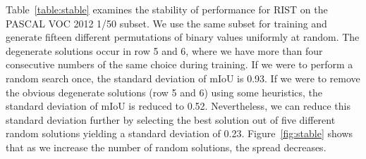 \documentclass[10pt, conference, compsocconf]{IEEEtran}
\begin{document}
\begin{table}[!htb]
\centering
{}
\bigskip
\caption{RIST semantic segmentation results on the PASCAL VOC 2012 validation set. Group experiment results are selected based on the best development mIoU. Random selection choices are P (pseudo-label only) or L (human-label only). There are a total of nine refinement stages ordered sequentially from left to right. }
\label{table:stable}
\end{table}


Table~\ref{table:stable} examines the stability of performance for RIST on the PASCAL VOC 2012 1/50 subset. We use the same subset for training and generate fifteen different permutations of binary  values uniformly at random.
The degenerate solutions occur in row 5 and 6, where we have more than four consecutive numbers of the same  choice during training. If we were to perform a random search once, the standard deviation of mIoU is 0.93. If we were to remove the obvious degenerate solutions (row 5 and 6) using some heuristics, the standard deviation of mIoU is reduced to 0.52. Nevertheless, we can reduce this standard deviation further by selecting the best solution out of five different random solutions yielding a standard deviation of 0.23. Figure~\ref{fig:stable} shows that as we increase the number of random solutions, the spread decreases.
\end{document}
